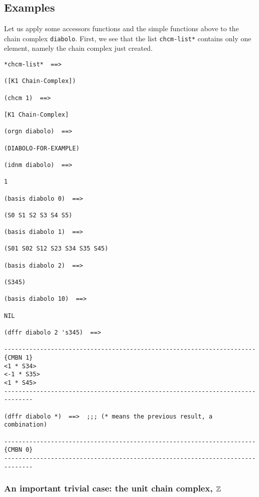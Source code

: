 \subsection* {Examples}

Let us apply some accessors functions and the simple  functions above to the chain complex {\tt diabolo}.
First, we see that the list {\tt *chcm-list*} contains only one element, namely the chain complex
just created.
{\footnotesize\begin{verbatim}
*chcm-list*  ==>

([K1 Chain-Complex])

(chcm 1)  ==>

[K1 Chain-Complex]

(orgn diabolo)  ==>

(DIABOLO-FOR-EXAMPLE)

(idnm diabolo)  ==>

1

(basis diabolo 0)  ==>

(S0 S1 S2 S3 S4 S5)

(basis diabolo 1)  ==>

(S01 S02 S12 S23 S34 S35 S45)

(basis diabolo 2)  ==>

(S345)

(basis diabolo 10)  ==>

NIL

(dffr diabolo 2 's345)  ==>

----------------------------------------------------------------------{CMBN 1}
<1 * S34>
<-1 * S35>
<1 * S45>
------------------------------------------------------------------------------

(dffr diabolo *)  ==>  ;;; (* means the previous result, a combination)

----------------------------------------------------------------------{CMBN 0}
------------------------------------------------------------------------------
\end{verbatim}}
\newpage

\subsubsection{An important trivial case: the unit chain complex, ${\mathbb{Z}}$}

